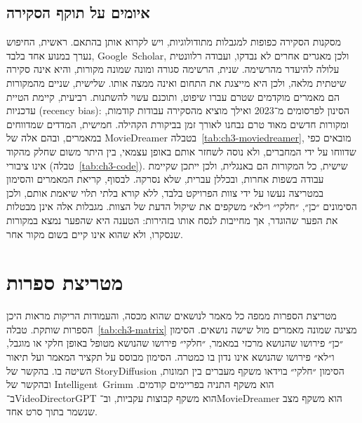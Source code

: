 \subsection{איומים על תוקף הסקירה}
\label{sec:ch3-threats}
מסקנות הסקירה כפופות למגבלות מתודולוגיות, ויש לקרוא אותן בהתאם. ראשית, החיפוש נערך במנוע אחד בלבד, \mbox{\textenglish{Google Scholar}}, ולכן מאגרים אחרים לא נבדקו, ועבודה רלוונטית עלולה להיעדר מהרשימה. שנית, הרשימה סגורה ומונה שמונה מקורות, והיא אינה סקירה שיטתית מלאה, ולכן היא מייצגת את התחום ואינה ממצה אותו. שלישית, שניים מהמקורות הם מאמרים מוקדמים שטרם עברו שיפוט, ותוכנם עשוי להשתנות. רביעית, קיימת הטיית עדכניות (\textenglish{recency bias}): הסינון לפרסומים מ־2023 ואילך מוציא מהסקירה עבודות קודמות, ומקורות חדשים מאוד טרם נבחנו לאורך זמן בביקורת הקהילה. חמישית, המדדים שמדווחים במאמרים, ובהם אלה של \textenglish{MovieDreamer} בטבלה~\ref{tab:ch3-moviedreamer}, מובאים כפי שדווחו על ידי המחברים, ולא נוסה לשחזר אותם באופן עצמאי, בין היתר משום שחלק מהקוד אינו ציבורי (טבלה~\ref{tab:ch3-code}). שישית, כל המקורות הם באנגלית, ולכן ייתכן שקיימת עבודה בשפות אחרות, ובכללן עברית, שלא נסרקה. לבסוף, קריאת המאמרים והסימון במטריצה נעשו על ידי צוות הפרויקט בלבד, ללא קורא בלתי תלוי שיאמת אותם, ולכן הסימונים ״כן״, ״חלקי״ ו״לא״ משקפים את שיקול הדעת של הצוות. מגבלות אלה אינן מבטלות את הפער שהוגדר, אך מחייבות לנסח אותו בזהירות: הטענה היא שהפער נמצא במקורות שנסקרו, ולא שהוא אינו קיים בשום מקור אחר.

\section{מטריצת ספרות}
\label{sec:ch3-matrix}
מטריצת הספרות ממפה כל מאמר לנושאים שהוא מכסה, והעמודות הריקות מראות היכן הספרות שותקת. טבלה~\ref{tab:ch3-matrix} מציגה שמונה מאמרים מול שישה נושאים. הסימון ״כן״ פירושו שהנושא מרכזי במאמר, ״חלקי״ פירושו שהנושא מטופל באופן חלקי או מוגבל, ו״לא״ פירושו שהנושא אינו נדון בו כמטרה. הסימון מבוסס על תקציר המאמר ועל תיאור השיטה בו. בהקשר של \textenglish{StoryDiffusion} הסימון ״חלקי״ בוידאו משקף מעברים בין תמונות, ובהקשר של \mbox{\textenglish{Intelligent Grimm}} הוא משקף התניה בפריימים קודמים. ב־\textenglish{VideoDirectorGPT} הוא משקף קבוצות עקביות, וב־\textenglish{MovieDreamer} הוא משקף מצב שנשמר בתוך סרט אחד.

